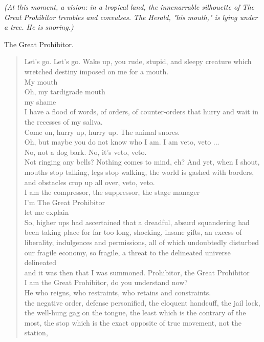 \documentclass[letterpaper,article,12pt,oneside,notitlepage]{memoir}
\begin{document}
\textit{(At this moment, a vision: in a tropical land, the innenarrable silhouette of The Great Prohibitor trembles and convulses. The Herald, "his mouth," is lying under a tree. He is snoring.)}

\begin{center}The Great Prohibitor.\end{center}

\begin{verse}
Let's go. Let's go. Wake up, you rude, stupid, and sleepy creature which wretched destiny imposed on me for a mouth.  \\
My mouth \\
Oh, my tardigrade mouth \\
my shame \\
I have a flood of words, of orders, of counter-orders that hurry and wait in the recesses of my saliva.  \\
Come on, hurry up, hurry up. The animal snores. \\
Oh, but maybe you do not know who I am. I am veto, veto ... \\
No, not a dog bark. No, it's veto, veto. \\
Not ringing any bells? Nothing comes to mind, eh? And yet, when I shout, mouths stop talking, legs stop walking, the world is gashed with borders, and obstacles crop up all over, veto, veto.  \\
I am the compressor, the suppressor, the stage manager \\
I'm The Great Prohibitor \\
let me explain \\
So, higher ups had ascertained that a dreadful, absurd squandering had been taking place for far too long, shocking, insane gifts, an excess of liberality, indulgences and permissions, all of which undoubtedly disturbed our fragile economy, so fragile, a threat to the delineated universe \\
delineated \\
and it was then that I was summoned. Prohibitor, the Great Prohibitor \\
I am the Great Prohibitor, do you understand now? \\
He who reigns, who restraints, who retains and constraints. \\
the negative order, defense personified, the eloquent handcuff, the jail lock, the well-hung gag on the tongue, the least which is the contrary of the most, the stop which is the exact opposite of true movement, not the station, \\
\end{verse}
\end{document}
